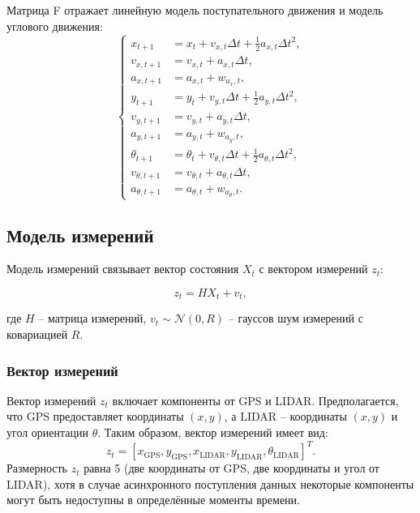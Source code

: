 Матрица F отражает линейную модель поступательного движения 
и модель углового движения:
\begin{equation}
\label{eq:state_transition_system}
\left\{
\begin{aligned}
x_{t+1} &= x_t + v_{x,t} \Delta t + \frac{1}{2} a_{x,t} \Delta t^2, \\
v_{x,t+1} &= v_{x,t} + a_{x,t} \Delta t, \\
a_{x,t+1} &= a_{x,t} + w_{a_x,t}, \\
y_{t+1} &= y_t + v_{y,t} \Delta t + \frac{1}{2} a_{y,t} \Delta t^2, \\
v_{y,t+1} &= v_{y,t} + a_{y,t} \Delta t, \\
a_{y,t+1} &= a_{y,t} + w_{a_y,t}, \\
\theta_{t+1} &= \theta_t + v_{\theta,t} \Delta t + \frac{1}{2} a_{\theta,t} \Delta t^2, \\
v_{\theta,t+1} &= v_{\theta,t} + a_{\theta,t} \Delta t, \\
a_{\theta,t+1} &= a_{\theta,t} + w_{a_\theta,t}.
\end{aligned}
\right.
\end{equation}

\subsection{Модель измерений}
\label{sec:measurement_model}

Модель измерений связывает вектор состояния \({X}_t\) с вектором измерений \({z}_t\):

\begin{equation}
{z}_t = {H} {X}_t + {v}_t,
\label{eq:measurement_model}
\end{equation}

где \({H}\) -- матрица измерений,
\({v}_t \sim \mathcal{N}(0, {R})\) -- гауссов шум измерений с ковариацией \({R}\).

\subsubsection{Вектор измерений}
\label{subsec:measurement_vector}

Вектор измерений \({z}_t\) включает компоненты от GPS и LIDAR. Предполагается, что GPS предоставляет координаты \((x, y)\), а LIDAR -- координаты \((x, y)\) и угол ориентации \(\theta\). Таким образом, вектор измерений имеет вид:
\[
{z}_t = [x_{\text{GPS}}, y_{\text{GPS}}, x_{\text{LIDAR}}, y_{\text{LIDAR}}, \theta_{\text{LIDAR}}]^T.
\]
Размерность \({z}_t\) равна 5 (две координаты от GPS, две координаты и угол от LIDAR), 
хотя в случае асинхронного поступления данных некоторые компоненты могут быть недоступны в определённые моменты времени.

